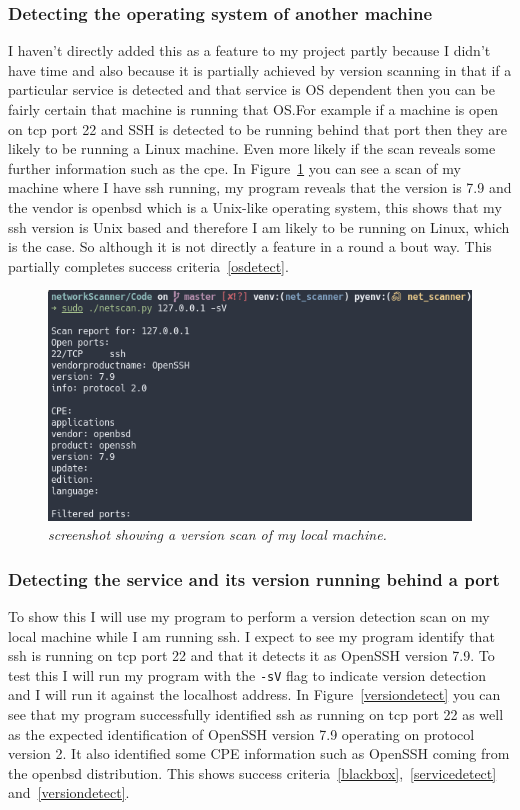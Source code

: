 \documentclass[titlepage]{article}
\let\Oldsubsubsection\subsubsection{}
\renewcommand{\subsubsection}{\FloatBarrier\Oldsubsubsection}
\begin{document}
\subsubsection{Detecting the operating system of another machine}
I haven't directly added this as a feature to my project partly because
I didn't have time and also because it is partially achieved by version
scanning in that if a particular service is detected and that service
is OS dependent then you can be fairly certain that machine is running
that OS.\@ For example if a machine is open on \gls{tcp} port 22
and SSH is detected to be running behind that port then they are likely
to be running a Linux machine. Even more likely if the scan reveals some
further information such as the \gls{cpe}. In Figure~\ref{sshversiondetect}
you can see a scan of my machine where I have \gls{ssh} running,
my program reveals that the version is 7.9 and the vendor is openbsd
which is a Unix-like operating system, this shows that my ssh version
is Unix based and therefore I am likely to be running on Linux, which is
the case. So although it is not directly a feature in a round a bout way.
This partially completes success criteria~\ref{osdetect}.

\begin{figure}[H]
  \centering
  \includegraphics[width=\textwidth]{sshversiondetect.png}
  \caption{\textit{%
    screenshot showing a version scan of my local machine.
}}\label{sshversiondetect}
\end{figure}

\subsubsection{Detecting the service and its version running behind a port}
To show this I will use my program to perform a version detection scan on my local machine
while I am running \gls{ssh}. I expect to see my program identify that \gls{ssh} is running
on \gls{tcp} port 22 and that it detects it as OpenSSH version 7.9. To test this
I will run my program with the \verb|-sV| flag to indicate version detection and
I will run it against the localhost address. In Figure~\ref{versiondetect}
you can see that my program successfully identified \gls{ssh} as running on
\gls{tcp} port 22 as well as the expected identification of OpenSSH version 7.9
operating on protocol version 2.
It also identified some CPE information such as OpenSSH coming from the openbsd
distribution.
This shows success criteria~\ref{blackbox},~\ref{servicedetect} and~\ref{versiondetect}.
\end{document}
